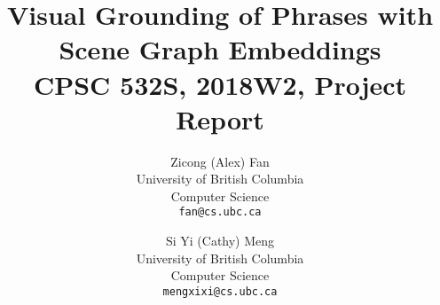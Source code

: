 \documentclass[10pt,twocolumn,letterpaper]{article}
\begin{document}
\title{%
  Visual Grounding of Phrases with Scene Graph Embeddings \\
  \large CPSC 532S, 2018W2, Project Report}

\author{Zicong (Alex) Fan\\
University of British Columbia\\
Computer Science\\
{\tt\small fan@cs.ubc.ca}
\and
Si Yi (Cathy) Meng\\
University of British Columbia\\
Computer Science\\
{\tt\small mengxixi@cs.ubc.ca}
}

\maketitle


{\small


}
\end{document}
